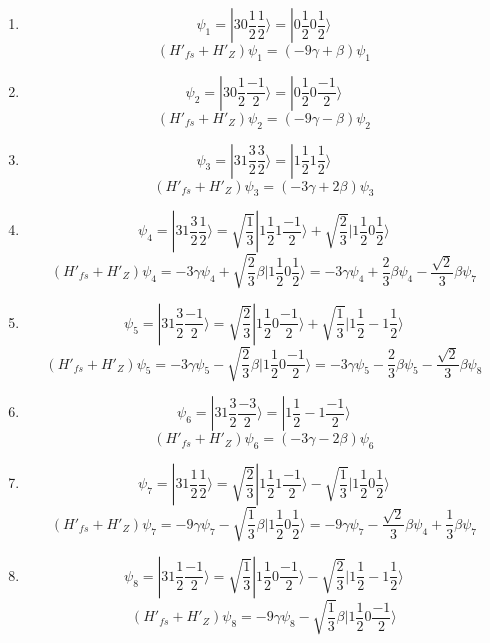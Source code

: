 \begin{enumerate}
    \item 
    $$
    \psi_1 = |30\frac{1}{2}\frac{1}{2}\rangle
    =|0\frac{1}{2}0\frac{1}{2}\rangle
    $$
    $$
    (H'_{fs} + H'_Z)\psi_1 = 
    (-9\gamma+\beta)\psi_1
    $$
    \item 
    $$
    \psi_2 = |30\frac{1}{2}\frac{-1}{2}\rangle
    =|0\frac{1}{2}0\frac{-1}{2}\rangle
    $$
    $$
    (H'_{fs} + H'_Z)\psi_2 = 
    (-9\gamma-\beta)\psi_2
    $$
    \item 
    $$
    \psi_3 = |31\frac{3}{2}\frac{3}{2}\rangle
    =|1\frac{1}{2}1\frac{1}{2}\rangle
    $$
    $$
    (H'_{fs} + H'_Z)\psi_3 = 
    (-3\gamma+2\beta)\psi_3
    $$
    \item 
    $$
    \psi_4 = |31\frac{3}{2}\frac{1}{2}\rangle
    =\sqrt{\frac{1}{3}}|1\frac{1}{2}1\frac{-1}{2}\rangle
    +\sqrt{\frac{2}{3}}
    |1\frac{1}{2}0\frac{1}{2}\rangle
    $$
    $$
    (H'_{fs} + H'_Z)\psi_4 = 
    -3\gamma\psi_4
    +\sqrt{\frac{2}{3}}\beta|1\frac{1}{2}0\frac{1}{2}\rangle
    =-3\gamma\psi_4
    +\frac{2}{3}\beta\psi_4
    -\frac{\sqrt{2}}{3}\beta\psi_7
    $$
    \item 
    $$
    \psi_5 = |31\frac{3}{2}\frac{-1}{2}\rangle
    =\sqrt{\frac{2}{3}}|1\frac{1}{2}0\frac{-1}{2}\rangle
    +\sqrt{\frac{1}{3}}
    |1\frac{1}{2}-1\frac{1}{2}\rangle
    $$
    $$
    (H'_{fs} + H'_Z)\psi_5 = 
    -3\gamma\psi_5
    -\sqrt{\frac{2}{3}}\beta|1\frac{1}{2}0\frac{-1}{2}\rangle
    =-3\gamma\psi_5-\frac{2}{3}\beta\psi_5-\frac{\sqrt{2}}{3}\beta\psi_8
    $$
    \item 
    $$
    \psi_6 = |31\frac{3}{2}\frac{-3}{2}\rangle
    =
    |1\frac{1}{2}-1\frac{-1}{2}\rangle
    $$
    $$
    (H'_{fs} + H'_Z)\psi_6 = 
    (-3\gamma-2\beta)\psi_6
    $$
    \item 
    $$
    \psi_7 = |31\frac{1}{2}\frac{1}{2}\rangle
    =\sqrt{\frac{2}{3}}|1\frac{1}{2}1\frac{-1}{2}\rangle
    -\sqrt{\frac{1}{3}}
    |1\frac{1}{2}0\frac{1}{2}\rangle
    $$
    $$
    (H'_{fs} + H'_Z)\psi_7 = 
    -9\gamma\psi_7
    -\sqrt{\frac{1}{3}}\beta|1\frac{1}{2}0\frac{1}{2}\rangle
    =-9\gamma\psi_7-\frac{\sqrt{2}}{3}\beta\psi_4
    +\frac{1}{3}\beta\psi_7
    $$
    \item 
    $$
    \psi_8 = |31\frac{1}{2}\frac{-1}{2}\rangle
    =
    \sqrt{\frac{1}{3}}|1\frac{1}{2}0\frac{-1}{2}\rangle
    -\sqrt{\frac{2}{3}}
    |1\frac{1}{2}-1\frac{1}{2}\rangle
    $$
    $$
    (H'_{fs} + H'_Z)\psi_8 = 
    -9\gamma\psi_8
    -\sqrt{\frac{1}{3}}\beta|1\frac{1}{2}0\frac{-1}{2}\rangle
$$
\end{enumerate}
